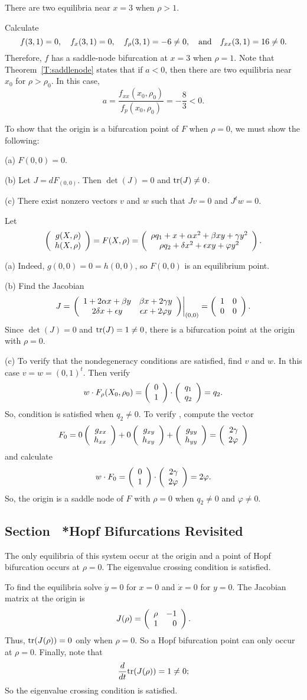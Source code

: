 \ans There are two equilibria near $x = 3$ when $\rho > 1$.

\soln Calculate
\[
f(3,1) = 0, \quad
f_x(3,1) = 0, \quad
f_\rho(3,1) = -6 \neq 0, \quad\mbox{and}\quad
f_{xx}(3,1) = 16 \neq 0.
\]
Therefore, $f$ has a saddle-node bifurcation at $x = 3$ when $\rho =
1$.  Note that Theorem~\ref{T:saddlenode} states
that if $a < 0$, then there are two equilibria near $x_0$ for $\rho >
\rho_0$.  In this case,
\[
a = \frac{f_{xx}(x_0,\rho_0)}{f_p(x_0,\rho_0)} = -\frac{8}{3} < 0.
\]

To show that the origin is a bifurcation point of $F$ when $\rho = 0$, we
must show the following:

(a) $F(0,0) = 0$.

(b) Let $J = dF_{(0,0)}$.  Then $\det(J) = 0$ and ${\rm tr}(J) \neq 0$.

(c) There exist nonzero vectors $v$ and $w$ such that $Jv = 0$ and
$J^tw = 0$.

\soln Let
\[
\left(\begin{array}{r} g(X,\rho) \\ h(X,\rho)\end{array}\right) = F(X,\rho) = 
\left(\begin{array}{c} \rho q_1 + x + \alpha x^2 + \beta xy + \gamma y^2 \\ \rho q_2 + \delta x^2 + \epsilon xy + \varphi y^2\end{array}\right).
\]

(a) Indeed, $g(0,0) = 0 = h(0,0)$, so $F(0,0)$ is an equilibrium point.

(b) Find the Jacobian
\[
J = \left.\left(\begin{array}{cc} 1 + 2\alpha x + \beta y & \beta x + 2\gamma y\\ 2\delta x + \epsilon y &\epsilon x + 2\varphi y\end{array}\right)\right|_{(0,0)} =
\left(\begin{array}{rr} 1 & 0\\ 0 &0\end{array}\right).
\]
Since $\det(J) = 0$ and ${\rm tr}(J) = 1 \neq 0$, there
is a bifurcation point at the origin with $\rho = 0$.

(c)  To verify that the nondegeneracy conditions are satisfied, find $v$
and $w$.  In this case $v = w = (0,1)^t$.  Then verify
\[
w \cdot F_\rho(X_0,\rho_0) = \left(\begin{array}{r} 0 \\ 1\end{array}\right) \cdot \left(\begin{array}{r} q_1 \\ q_2\end{array}\right)
= q_2.
\]
So, condition  is satisfied when $q_2 \neq 0$.  To
verify , compute the vector
\[
F_0 = 0\left(\begin{array}{r} g_{xx} \\ h_{xx}\end{array}\right) + 0\left(\begin{array}{r} g_{xy} \\ h_{xy}\end{array}\right) +
\left(\begin{array}{r} g_{yy} \\ h_{yy}\end{array}\right) = \left(\begin{array}{r} 2\gamma \\ 2\varphi\end{array}\right)
\]
and calculate
\[
w \cdot F_0 = \left(\begin{array}{r} 0 \\ 1\end{array}\right) \cdot \left(\begin{array}{r} 2\gamma \\ 2\varphi\end{array}\right)
= 2\varphi.
\]
So, the origin is a saddle node of $F$ with $\rho = 0$ when
$q_2 \neq 0$ and $\varphi \neq 0$.



\subsection*{Section~\protect{\ref{S:HopfBif}} *Hopf Bifurcations Revisited}

\ans The only equilibria of this system occur at the origin and a point of
Hopf bifurcation occurs at $\rho=0$.  The eigenvalue crossing condition is
satisfied.

\soln  To find the equilibria solve $\dot{y}=0$ for $x=0$ and $\dot{x}=0$ for
$y=0$.  The Jacobian matrix at the origin is 
\[
J(\rho) = \left(\begin{array}{rr} \rho & -1\\ 1 &0\end{array}\right).
\]
Thus, ${\rm tr}(J(\rho))=0$ only when $\rho=0$.  So a Hopf bifurcation point
can only occur at $\rho=0$.  Finally, note that 
\[
\frac{d}{dt}{\rm tr}(J(\rho)) = 1 \neq 0;
\]
So the eigenvalue crossing condition is satisfied.



